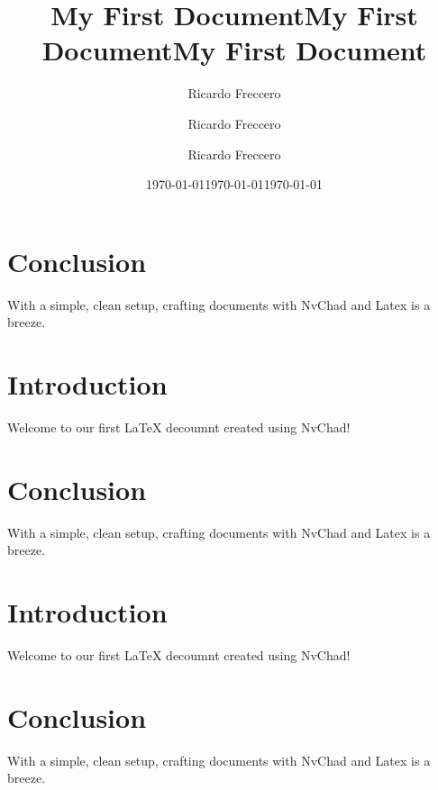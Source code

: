 \section{Conclusion}
With a simple, clean setup, crafting documents with NvChad and Latex is a breeze.




\title{My First Document}
\author{Ricardo Freccero}

\date{\today}
\maketitle

\section{Introduction}
Welcome to our first LaTeX decoumnt created using NvChad!

\section{Conclusion}
With a simple, clean setup, crafting documents with NvChad and Latex is a breeze.




\title{My First Document}
\author{Ricardo Freccero}

\date{\today}
\maketitle

\section{Introduction}
Welcome to our first LaTeX decoumnt created using NvChad!

\section{Conclusion}
With a simple, clean setup, crafting documents with NvChad and Latex is a breeze.




\title{My First Document}
\author{Ricardo Freccero}

\date{\today}
\maketitle

